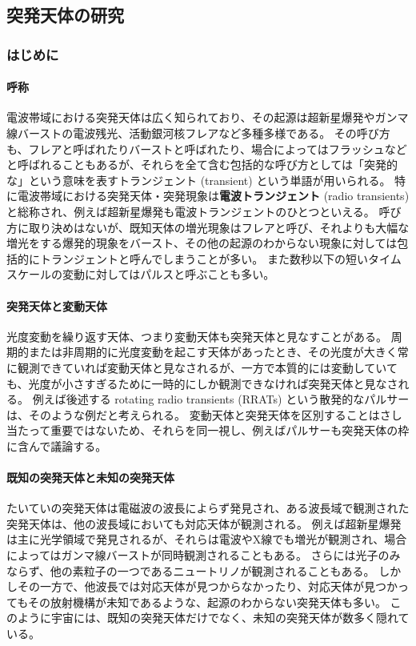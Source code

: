\subsection{突発天体の研究} \label{transients.s1.introduction}
\subsubsection{はじめに}

\paragraph{呼称}
電波帯域における突発天体は広く知られており、その起源は超新星爆発やガンマ線バーストの電波残光、活動銀河核フレアなど多種多様である。
その呼び方も、フレアと呼ばれたりバーストと呼ばれたり、場合によってはフラッシュなどと呼ばれることもあるが、それらを全て含む包括的な呼び方としては「突発的な」という意味を表すトランジェント (transient) という単語が用いられる。
特に電波帯域における突発天体・突発現象は{\bf 電波トランジェント} (radio transients) と総称され、例えば超新星爆発も電波トランジェントのひとつといえる。
呼び方に取り決めはないが、既知天体の増光現象はフレアと呼び、それよりも大幅な増光をする爆発的現象をバースト、その他の起源のわからない現象に対しては包括的にトランジェントと呼んでしまうことが多い。
また数秒以下の短いタイムスケールの変動に対してはパルスと呼ぶことも多い。

\paragraph{突発天体と変動天体}
光度変動を繰り返す天体、つまり変動天体も突発天体と見なすことがある。
周期的または非周期的に光度変動を起こす天体があったとき、その光度が大きく常に観測できていれば変動天体と見なされるが、一方で本質的には変動していても、光度が小さすぎるために一時的にしか観測できなければ突発天体と見なされる。
例えば後述する rotating radio transients (RRATs) という散発的なパルサーは、そのような例だと考えられる。
変動天体と突発天体を区別することはさし当たって重要ではないため、それらを同一視し、例えばパルサーも突発天体の枠に含んで議論する。

\paragraph{既知の突発天体と未知の突発天体}
たいていの突発天体は電磁波の波長によらず発見され、ある波長域で観測された突発天体は、他の波長域においても対応天体が観測される。
例えば超新星爆発は主に光学領域で発見されるが、それらは電波やX線でも増光が観測され、場合によってはガンマ線バーストが同時観測されることもある。
さらには光子のみならず、他の素粒子の一つであるニュートリノが観測されることもある。
しかしその一方で、他波長では対応天体が見つからなかったり、対応天体が見つかってもその放射機構が未知であるような、起源のわからない突発天体も多い。
このように宇宙には、既知の突発天体だけでなく、未知の突発天体が数多く隠れている。

